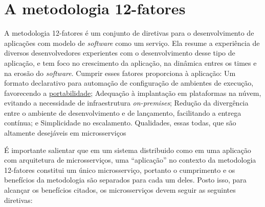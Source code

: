 



\section{A metodologia 12-fatores}\label{metodologia-12-fatores}

A metodologia 12-fatores é um conjunto de diretivas para o desenvolvimento de aplicações com modelo de \emph{software} como um serviço. Ela resume a experiência de diversos desenvolvedores experientes com o desenvolvimento desse tipo de aplicação, e tem foco no crescimento da aplicação, na dinâmica entres os times e na erosão do \emph{software}. Cumprir esses fatores proporciona à aplicação: Um formato declarativo para automação de configuração de ambientes de execução, favorecendo a \hyperref[sec:portabilidade]{portabilidade}; Adequação à implantação em plataformas na núvem, evitando a necessidade de infraestrutura \emph{on-premises}; Redução da divergência entre o ambiente de desenvolvimento e de lançamento, facilitando a entrega contínua; e Simplicidade no escalamento. Qualidades, essas todas, que são altamente desejáveis em microsserviços \cite{12factor, 12fatores-rita}

É importante salientar que em um sistema distribuido como em uma aplicação com arquitetura de microsserviços, uma “aplicação” no contexto da metodologia 12-fatores constitui um único microsserviço, portanto o cumprimento e os benefícios da metodologia são separados para cada um deles. Posto isso, para alcançar os benefícios citados, os microsserviços devem seguir as seguintes diretivas:

